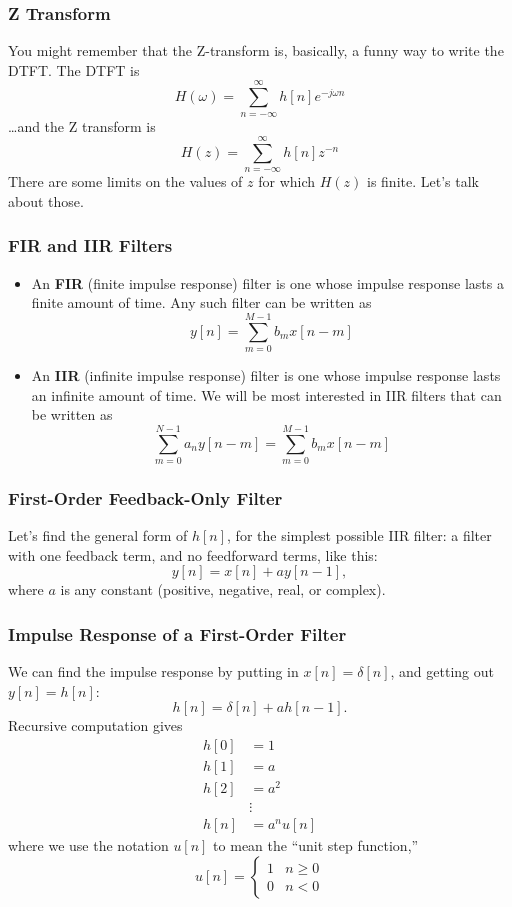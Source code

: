 \documentclass{beamer}
\begin{document}
\begin{frame}
  \frametitle{Z Transform}
  You might remember that the Z-transform is, basically, a funny way to write the
  DTFT.  The DTFT is
  \[
  H(\omega) = \sum_{n=-\infty}^\infty h[n]e^{-j\omega n}
  \]
  \ldots and the Z  transform is
  \[
  H(z) = \sum_{n=-\infty}^\infty h[n]z^{-n}
  \]
  There are some limits on the values of $z$ for which $H(z)$ is
  finite.  Let's talk about those.
\end{frame}

\begin{frame}
  \frametitle{FIR and IIR Filters}

  \begin{itemize}
  \item An {\bf FIR} (finite impulse response) filter is one
    whose impulse response lasts a finite amount of time.  Any such filter
    can be written as
    \[
    y[n] = \sum_{m=0}^{M-1} b_m x[n-m]
    \]
  \item An {\bf IIR} (infinite impulse response) filter is one whose
    impulse response lasts an infinite amount of time.  We will be
    most interested in IIR filters that can be written as
    \[
    \sum_{m=0}^{N-1} a_n y[n-m] = \sum_{m=0}^{M-1} b_m x[n-m]
    \]
  \end{itemize}
  
\end{frame}


\begin{frame}
  \frametitle{First-Order Feedback-Only Filter}

  Let's find the general form of $h[n]$, for the simplest possible
  IIR filter: a filter with one feedback term, and no
  feedforward terms, like this:
  \[
  y[n] = x[n] + ay[n-1],
  \]
  where $a$ is any constant (positive, negative, real, or complex).
\end{frame}

\begin{frame}
  \frametitle{Impulse Response of a First-Order Filter}

  We can find the impulse response by putting in $x[n]=\delta[n]$, and
  getting out $y[n]=h[n]$:
  \[
  h[n] = \delta[n] + ah[n-1].
  \]
  Recursive computation gives
  \begin{align*}
    h[0] &= 1 \\
    h[1] &= a\\
    h[2] &= a^2\\
     & \vdots\\
    h[n] &= a^nu[n]
  \end{align*}
  where we use the notation $u[n]$ to mean the ``unit step function,''
  \[u[n] = \begin{cases}1& n\ge 0\\0 & n<0\end{cases}\]
\end{frame}
\end{document}
